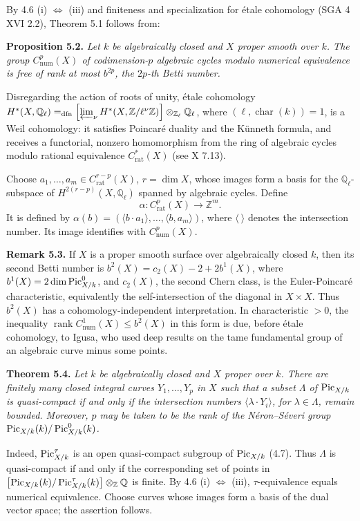 By 4.6 (i) \(\Longleftrightarrow\) (iii) and finiteness and specialization
for \'etale cohomology (SGA 4 XVI 2.2), Theorem 5.1 follows from:

\textbf{Proposition 5.2.} \emph{Let \(k\) be algebraically closed and
\(X\) proper smooth over \(k\). The group \(C^p_{\mathrm{num}}(X)\) of
codimension-\(p\) algebraic cycles modulo numerical equivalence is free
of rank at most \(b^{2p}\), the \(2p\)-th Betti number.}

Disregarding the action of roots of unity, \'etale cohomology
\(H^*(X,\mathbb Q_\ell)=_{\mathrm{dfn}}\allowbreak
\left[\varprojlim_\nu H^*(X,\mathbb Z/\ell^\nu\mathbb Z)\right]
\allowbreak\otimes_{\mathbb Z_\ell}\mathbb Q_\ell\), where
\((\ell,\operatorname{char}(k))=1\), is a Weil cohomology: it satisfies
Poincar\'e duality and the K\"unneth formula, and receives a functorial,
nonzero homomorphism from the ring of algebraic cycles modulo rational
equivalence \(C^*_{\mathrm{rat}}(X)\) (see X 7.13).

Choose \(a_1,\ldots,a_m\in C^{r-p}_{\mathrm{rat}}(X)\), \(r=\dim X\),
whose images form a basis for the \(\mathbb Q_\ell\)-subspace of
\(H^{2(r-p)}(X,\mathbb Q_\ell)\) spanned by algebraic cycles. Define
\[
\alpha:C^p_{\mathrm{rat}}(X)\longrightarrow\mathbb Z^m.
\]
It is defined by
\(\alpha(b)=(\langle b\cdot a_1\rangle,\ldots,\langle b,a_m\rangle)\),
where \(\langle\ \rangle\) denotes the intersection number. Its image
identifies with \(C^p_{\mathrm{num}}(X)\).

\textbf{Remark 5.3.} If \(X\) is a proper smooth surface over
algebraically closed \(k\), then its second Betti number is
\(b^2(X)=c_2(X)-2+2b^1(X)\), where
\(b^1(X)=2\dim\operatorname{Pic}^0_{X/k}\), and \(c_2(X)\), the second Chern
class, is the Euler-Poincar\'e characteristic, equivalently the
self-intersection of the diagonal in \(X\times X\). Thus \(b^2(X)\) has
a cohomology-independent interpretation. In characteristic \(>0\), the
inequality \(\operatorname{rank}C^1_{\mathrm{num}}(X)\le b^2(X)\) in
this form is due, before \'etale cohomology, to Igusa, who used deep
results on the tame fundamental group of an algebraic curve minus some
points.

\textbf{Theorem 5.4.} \emph{Let \(k\) be algebraically closed and \(X\)
proper over \(k\). There are finitely many closed integral curves
\(Y_1,\ldots,Y_p\) in \(X\) such that a subset \(\Lambda\) of
\(\operatorname{Pic}_{X/k}\) is quasi-compact if and only if the intersection numbers
\(\langle\lambda\cdot Y_i\rangle\), for \(\lambda\in\Lambda\), remain
bounded. Moreover, \(p\) may be taken to be the rank of the
N\'eron--S\'everi group \(\operatorname{Pic}_{X/k}(k)/\operatorname{Pic}^0_{X/k}(k)\).}

Indeed, \(\operatorname{Pic}^\tau_{X/k}\) is an open quasi-compact subgroup of
\(\operatorname{Pic}_{X/k}\) (4.7). Thus \(\Lambda\) is quasi-compact if and only if
the corresponding set of points in
\(\bigl[\operatorname{Pic}_{X/k}(k)/\operatorname{Pic}^\tau_{X/k}(k)\bigr]
\otimes_{\mathbb Z}\mathbb Q\) is finite. By 4.6 (i)
\(\Longleftrightarrow\) (iii),
\(\tau\)-equivalence equals numerical equivalence. Choose curves whose
images form a basis of the dual vector space; the assertion follows.

